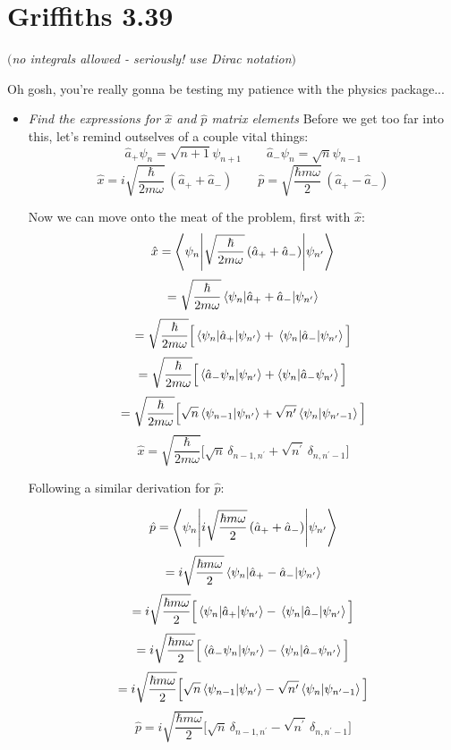 \documentclass[12pt]{article}
\begin{document}
\newpage

\section*{Griffiths 3.39}
\emph{$($no integrals allowed - seriously! use Dirac notation$)$}

Oh gosh, you're really gonna be testing my patience with the physics package...

\begin{itemize}
\item \emph{Find the expressions for $\hat{x}$ and $\hat{p}$ matrix elements}
Before we get too far into this, let's remind outselves of a couple vital things:
\[\hat{a}_+ \psi_n = \sqrt{n+1}\psi_{n+1} \qquad \hat{a}_- \psi_n = \sqrt{n}\psi_{n-1}\]
\[\hat{x} = i\sqrt{\frac{\hbar}{2m\omega}}\, (\hat{a}_+ + \hat{a}_-) \qquad \hat{p} = \sqrt{\frac{\hbar m \omega}{2}}\, (\hat{a}_+ - \hat{a}_-)\]

Now we can move onto the meat of the problem, first with $\hat{x}$:
\[\hat{x} = \mel**{\psi_n}{\sqrt{\frac{\hbar}{2m\omega}}\, (\hat{a}_+ + \hat{a}_-)}{\psi_{n^\prime}}\]
\[= \sqrt{\frac{\hbar}{2m\omega}} \mel{\psi_n}{\hat{a}_+ + \hat{a}_-}{\psi_{n^\prime}}\]
\[= \sqrt{\frac{\hbar}{2m\omega}} \Big[\mel{\psi_n}{\hat{a}_+}{\psi_{n^\prime}} + \mel{\psi_n}{\hat{a}_-}{\psi_{n^\prime}}\Big]\]
\[= \sqrt{\frac{\hbar}{2m\omega}}\Big[\braket{\hat{a}_- \psi_n}{\psi_{n^\prime}} + \braket{\psi_n}{\hat{a}_- \psi_{n^\prime}}\Big]\]
\[= \sqrt{\frac{\hbar}{2m\omega}}\Big[\sqrt{n}\braket{\psi_{n-1}}{\psi_{n^\prime}} + \sqrt{n^\prime}\braket{\psi_n}{\psi_{n^\prime - 1}}\Big]\]
\[\boxed{\hat{x}= \sqrt{\frac{\hbar}{2m\omega}}\Big[\sqrt{n}\, \delta_{n-1, n^\prime} + \sqrt{n^\prime}\, \delta_{n, n^\prime-1}\Big]}\]

Following a similar derivation for $\hat{p}$:

\[\hat{p} = \mel**{\psi_n}{i\sqrt{\frac{\hbar m \omega}{2}}\, (\hat{a}_+ + \hat{a}_-)}{\psi_{n^\prime}}\]
\[= i\sqrt{\frac{\hbar m \omega}{2}} \mel{\psi_n}{\hat{a}_+ - \hat{a}_-}{\psi_{n^\prime}}\]
\[= i\sqrt{\frac{\hbar m \omega}{2}} \Big[\mel{\psi_n}{\hat{a}_+}{\psi_{n^\prime}} - \mel{\psi_n}{\hat{a}_-}{\psi_{n^\prime}}\Big]\]
\[= i\sqrt{\frac{\hbar m \omega}{2}}\Big[\braket{\hat{a}_- \psi_n}{\psi_{n^\prime}} - \braket{\psi_n}{\hat{a}_- \psi_{n^\prime}}\Big]\]
\[= i\sqrt{\frac{\hbar m \omega}{2}}\Big[\sqrt{n}\braket{\psi_{n-1}}{\psi_{n^\prime}} - \sqrt{n^\prime}\braket{\psi_n}{\psi_{n^\prime - 1}}\Big]\]
\[\boxed{\hat{p}= i\sqrt{\frac{\hbar m \omega}{2}}\Big[\sqrt{n}\, \delta_{n-1, n^\prime} - \sqrt{n^\prime}\, \delta_{n, n^\prime-1}\Big]}\]




\end{itemize}
\end{document}
